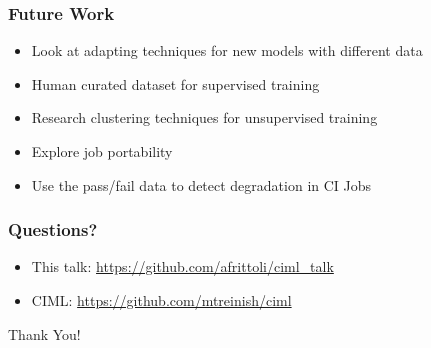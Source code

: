 \documentclass[aspectratio=169,11pt,hyperref={colorlinks=true}]{beamer}
\begin{document}
\begin{frame}
  \frametitle{Future Work}
  \begin{itemize}
      \item{Look at adapting techniques for new models with different data}
      \item{Human curated dataset for supervised training}
      \item{Research clustering techniques for unsupervised training}
      \item{Explore job portability}
      \item{Use the pass/fail data to detect degradation in CI Jobs}
  \end{itemize}
\end{frame}

\begin{frame}
  \frametitle{Questions?}
  \begin{itemize}
      \item{This talk: \href{https://github.com/afrittoli/ciml\_talk}{https://github.com/afrittoli/ciml\_talk}}
      \item{CIML: \href{https://github.com/mtreinish/ciml}{https://github.com/mtreinish/ciml}}
  \end{itemize}
\end{frame}

\begin{centraldark}{Thank You!}\end{centraldark}
\end{document}
